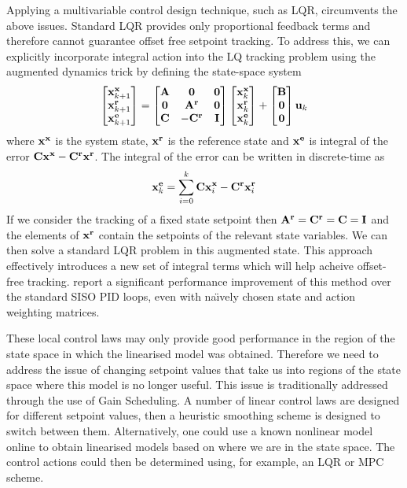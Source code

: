 Applying a multivariable control design technique, such as LQR, circumvents the above issues. Standard LQR provides only proportional feedback terms and therefore cannot guarantee offset free setpoint tracking. To address this, we can explicitly incorporate integral action into the LQ tracking problem using the augmented dynamics trick by defining the state-space system
\begin{equation}
\begin{bmatrix} \mathbf{x}^{\mathbf{x}}_{k+1} \\ \mathbf{x}^{\mathbf{r}}_{k+1} \\ \mathbf{x}^{\mathbf{e}}_{k+1} \end{bmatrix} = 
\begin{bmatrix} \mathbf{A} & \mathbf{0} & \mathbf{0} \\ \mathbf{0} & \mathbf{A}^{\mathbf{r}} & \mathbf{0} \\ \mathbf{C} & -\mathbf{C}^{\mathbf{r}} & \mathbf{I} \end{bmatrix}
\begin{bmatrix} \mathbf{x}^{\mathbf{x}}_{k} \\ \mathbf{x}^{\mathbf{r}}_{k} \\ \mathbf{x}^{\mathbf{e}}_{k} \end{bmatrix}
+ \begin{bmatrix} \mathbf{B} \\ \mathbf{0} \\ \mathbf{0} \end{bmatrix}\mathbf{u}_k
\label{eqn:evap_aug}
\end{equation}
where $\mathbf{x}^{\mathbf{x}}$ is the system state, $\mathbf{x}^{\mathbf{r}}$ is the reference state and $\mathbf{x}^{\mathbf{e}}$ is integral of the error $\mathbf{C}\mathbf{x}^{\mathbf{x}} - \mathbf{C}^{\mathbf{r}}\mathbf{x}^{\mathbf{r}}$. The integral of the error can be written in discrete-time as
\begin{equation*}
\mathbf{x}^{\mathbf{e}}_{k} = \sum_{i=0}^k  \mathbf{C}\mathbf{x}^{\mathbf{x}}_i - \mathbf{C}^{\mathbf{r}}\mathbf{x}^{\mathbf{r}}_i
\end{equation*}
If we consider the tracking of a fixed state setpoint then $\mathbf{A}^{\mathbf{r}} = \mathbf{C}^{\mathbf{r}} = \mathbf{C} = \mathbf{I}$ and the elements of $\mathbf{x}^{\mathbf{r}}$ contain the setpoints of the relevant state variables. We can then solve a standard LQR problem in this augmented state.
%
This approach effectively introduces a new set of integral terms which will help acheive offset-free tracking. \cite{NeLe89} report a significant performance improvement of this method over the standard SISO PID loops, even with na\"{\i}vely chosen state and action weighting matrices. 


These local control laws may only provide good performance in the region of the state space in which the linearised model was obtained. Therefore we need to address the issue of changing setpoint values that take us into regions of the state space where this model is no longer useful. This issue is traditionally addressed through the use of Gain Scheduling. A number of linear control laws are designed for different setpoint values, then a heuristic smoothing scheme is designed to switch between them. Alternatively, one could use a known nonlinear model online to obtain linearised models based on where we are in the state space. The control actions could then be determined using, for example, an LQR or MPC scheme.




